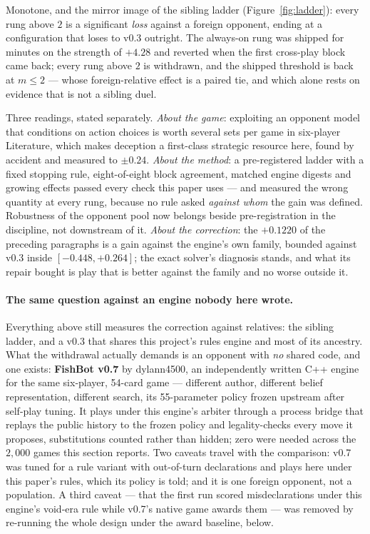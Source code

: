 \documentclass[11pt,a4paper]{article}
\begin{document}
Monotone, and the mirror image of the sibling ladder
(Figure~\ref{fig:ladder}): every rung above $2$ is
a significant \emph{loss} against a foreign opponent, ending at a
configuration that loses to v0.3 outright. The always-on rung was shipped for
minutes on the strength of $+4.28$ and reverted when the first cross-play
block came back; every rung above $2$ is withdrawn, and the shipped threshold
is back at $m \le 2$ --- whose foreign-relative effect is a paired tie, and
which alone rests on evidence that is not a sibling duel.

Three readings, stated separately. \emph{About the game}: exploiting an
opponent model that conditions on action choices is worth several sets per
game in six-player Literature, which makes deception a first-class strategic
resource here, found by accident and measured to $\pm 0.24$. \emph{About the
method}: a pre-registered ladder with a fixed stopping rule, eight-of-eight
block agreement, matched engine digests and growing effects passed every
check this paper uses --- and measured the wrong quantity at every rung,
because no rule asked \emph{against whom} the gain was defined. Robustness
of the opponent pool now belongs beside pre-registration in the discipline,
not downstream of it. \emph{About the correction}: the $+0.1220$ of the
preceding paragraphs is a gain against the engine's own family, bounded
against v0.3 inside $[-0.448, +0.264]$; the exact solver's diagnosis stands,
and what its repair bought is play that is better against the family and no
worse outside it.

\paragraph{The same question against an engine nobody here wrote.} Everything
above still measures the correction against relatives: the sibling ladder, and
a v0.3 that shares this project's rules engine and most of its ancestry. What
the withdrawal actually demands is an opponent with \emph{no} shared code, and
one exists: \textbf{FishBot v0.7} by dylann4500, an independently written
C++ engine for the same six-player, 54-card game --- different author,
different belief representation, different search, its 55-parameter policy
frozen upstream after self-play tuning. It plays under this engine's arbiter
through a process bridge that replays the public history to the frozen policy and
legality-checks every move it proposes, substitutions counted rather than
hidden; zero were needed across the $2{,}000$ games this section reports.
Two caveats travel with the comparison: v0.7 was tuned for a rule variant
with out-of-turn declarations and plays here under this paper's rules, which
its policy is told; and it is one foreign opponent, not a population. A
third caveat --- that the first run scored misdeclarations under this
engine's void-era rule while v0.7's native game awards them --- was removed
by re-running the whole design under the award baseline, below.
\end{document}
